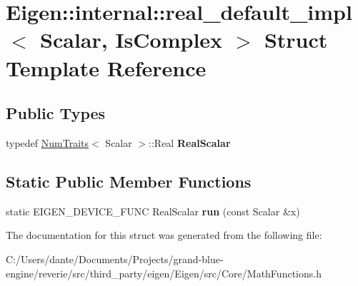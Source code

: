 \hypertarget{struct_eigen_1_1internal_1_1real__default__impl}{}\section{Eigen\+::internal\+::real\+\_\+default\+\_\+impl$<$ Scalar, Is\+Complex $>$ Struct Template Reference}
\label{struct_eigen_1_1internal_1_1real__default__impl}
\subsection*{Public Types}
\begin{DoxyCompactItemize}
\item 
\mbox{\label{struct_eigen_1_1internal_1_1real__default__impl_ab3958a91e828019731789f7084537d2b}} 
typedef \mbox{\hyperlink{struct_eigen_1_1_num_traits}{Num\+Traits}}$<$ Scalar $>$\+::Real {\bfseries Real\+Scalar}
\end{DoxyCompactItemize}
\subsection*{Static Public Member Functions}
\begin{DoxyCompactItemize}
\item 
\mbox{\label{struct_eigen_1_1internal_1_1real__default__impl_a538390c4190dbb4ee7b7d2591143886f}} 
static E\+I\+G\+E\+N\+\_\+\+D\+E\+V\+I\+C\+E\+\_\+\+F\+U\+NC Real\+Scalar {\bfseries run} (const Scalar \&x)
\end{DoxyCompactItemize}


The documentation for this struct was generated from the following file\+:\begin{DoxyCompactItemize}
\item 
C\+:/\+Users/dante/\+Documents/\+Projects/grand-\/blue-\/engine/reverie/src/third\+\_\+party/eigen/\+Eigen/src/\+Core/Math\+Functions.\+h\end{DoxyCompactItemize}

